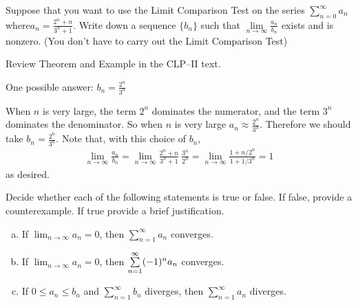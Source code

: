\begin{question}[2016Q5]
Suppose that you want to use the Limit Comparison Test on the series
$ \displaystyle \sum_{n=0}^{\infty} a_n$ where\linebreak $\displaystyle a_n = \frac{2^n+n}{3^n+1}$.
Write down a sequence $\{b_n\}$ such that $\displaystyle \lim\limits_{n\to\infty} \frac{a_n}{b_n}$
exists and is nonzero. (You don't have to carry out the Limit Comparison Test)
\end{question}

\begin{hint}
Review  Theorem  and
Example  in the CLP--II text.

\end{hint}

\begin{answer}
One possible answer:
$b_n=\displaystyle \frac{2^n}{3^n}$
\end{answer}

\begin{solution}
When $n$ is very large, the term $2^n$ dominates the numerator,
and the term $3^n$ dominates the denominator.  So when $n$ is very large
$a_n\approx   \frac{2^n}{3^n}$. Therefore we should  take $b_n=\displaystyle \frac{2^n}{3^n}$.
Note that, with this choice of $b_n$,
\begin{align*}
 \lim_{n\to\infty} \frac{a_n}{b_n}
= \lim_{n\to\infty} \frac{2^n+n}{3^n+1}\ \frac{3^n}{2^n}
= \lim_{n\to\infty} \frac{1+ n/2^{n}}{1+1/3^{n}}
=1
\end{align*}
as desired.
\end{solution}

\begin{Mquestion}[2014D, 2016A]
Decide whether each of the following statements is true or false.
If false, provide a counterexample. If true provide a brief justification.

\begin{enumerate}[(a)]
\item
If $\displaystyle\lim_{n\rightarrow\infty}a_n=0$,
               then $\sum\limits_{n=1}^{\infty} a_n$ converges.
\item
 If $\displaystyle\lim_{n\rightarrow\infty}a_n=0$,
               then $\sum\limits_{n=1}^{\infty} (-1)^{n\mathstrut} a_n$ converges.
\item
If $0\le a_n \le b_n$ and $\sum\limits_{n=1}^{\infty} b_n$ diverges,
then $\sum\limits_{n=1}^{\infty} a_n$ diverges.
\end{enumerate}
\end{Mquestion}

